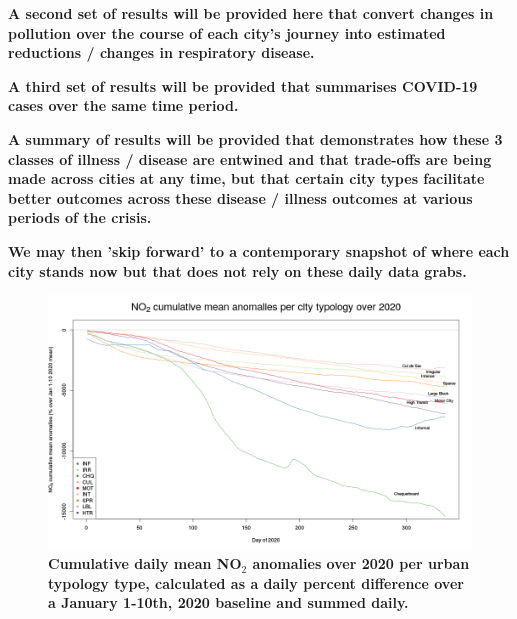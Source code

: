 \documentclass[preprint,12pt]{elsarticle}
\begin{document}
\textbf{A second set of results will be provided here that convert changes in pollution over the course of each city's journey into estimated reductions / changes in respiratory disease.}

\textbf{A third set of results will be provided that summarises COVID-19 cases over the same time period.} 

\textbf{A summary of results will be provided that demonstrates how these 3 classes of illness / disease are entwined and that trade-offs are being made across cities at any time, but that certain city types facilitate better outcomes across these disease / illness outcomes at various periods of the crisis.}

\textbf{We may then 'skip forward' to a contemporary snapshot of where each city stands now but that does not rely on these daily data grabs.}


\begin{figure}
\centering
\includegraphics[trim={0 19 22 43},clip,scale=0.45]{Images/no2CulmReductionClusterMean_2020.png}
\caption{\bf Cumulative daily mean NO$_{2}$ anomalies over 2020 per urban typology type, calculated as a daily percent difference over a January 1-10th, 2020 baseline and summed daily. }
 \label{fig:no2}
\end{figure}
\end{document}
